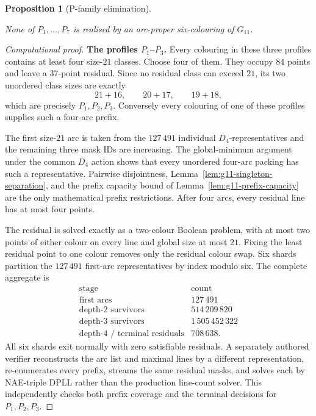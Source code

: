 \documentclass[11pt]{article}
\newtheorem{proposition}[theorem]{Proposition}
\theoremstyle{definition}
\theoremstyle{remark}
\newcommand{\Dfour}{D_4}
\begin{document}
\begin{proposition}[P-family elimination]\label{prop:g11-P}

None of \(P_1,\ldots,P_7\) is realised by an arc-proper six-colouring of
\(G_{11}\).

\end{proposition}

\begin{proof}[Computational proof]
\medskip\noindent\textbf{The profiles \(P_1\)--\(P_3\).}\quad
Every colouring in these three profiles contains at least four size-\(21\)
classes.  Choose four of them.  They occupy \(84\) points and leave a
\(37\)-point residual.  Since no residual class can exceed \(21\), its two
unordered class sizes are exactly
\[
  21+16,\qquad 20+17,\qquad 19+18,
\]
which are precisely \(P_1,P_2,P_3\).  Conversely every colouring of one of
these profiles supplies such a four-arc prefix.

The first size-\(21\) arc is taken from the \(127\,491\) individual
\(\Dfour\)-representatives and the remaining three mask IDs are increasing.
The global-minimum argument under the common \(\Dfour\) action shows that
every unordered four-arc packing has such a representative.  Pairwise
disjointness, Lemma~\ref{lem:g11-singleton-separation}, and the prefix
capacity bound of Lemma~\ref{lem:g11-prefix-capacity} are the only
mathematical prefix restrictions.  After four arcs, every residual line has
at most four points.

The residual is solved exactly as a two-colour Boolean problem, with at most
two points of either colour on every line and global size at most \(21\).
Fixing the least residual point to one colour removes only the residual colour
swap.  Six shards partition the \(127\,491\) first-arc representatives by
index modulo six.  The complete aggregate is
\[
\begin{array}{c|r}
\text{stage} & \text{count}\\ \hline
\text{first arcs} & 127\,491\\
\text{depth-2 survivors} & 514\,209\,820\\
\text{depth-3 survivors} & 1\,505\,452\,322\\
\text{depth-4 / terminal residuals} & 708\,638.
\end{array}
\]
All six shards exit normally with zero satisfiable residuals.  A separately
authored verifier reconstructs the arc list and maximal lines by a different
representation, re-enumerates every prefix, streams the same residual masks,
and solves each by NAE-triple DPLL rather than the production line-count
solver.  This independently checks both prefix coverage and the terminal decisions
for \(P_1,P_2,P_3\).


\end{proof}
\end{document}
